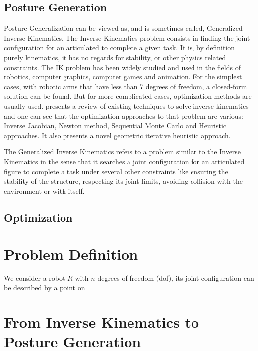\subsection{Posture Generation}
\label{sub:posture_generation}

Posture Generalization can be viewed as, and is sometimes called, Generalized Inverse Kinematics.
The Inverse Kinematics problem consists in finding the joint configuration for an articulated to complete a given task.
It is, by definition purely kinematics, it has no regards for stability, or other physics related constraints.
The IK problem has been widely studied and used in the fields of robotics, computer graphics, computer games and animation.
For the simplest cases, with robotic arms that have less than 7 degrees of freedom, a closed-form solution can be found.
But for more complicated cases, optimization methods are usually used.
\cite{aristidou2009} presents a review of existing techniques to solve inverse kinematics and one can see that the optimization approaches to that problem are various: Inverse Jacobian, Newton method, Sequential Monte Carlo and Heuristic approaches. It also presents a novel geometric iterative heuristic approach.

The Generalized Inverse Kinematics refers to a problem similar to the Inverse Kinematics in the sense that it searches a joint configuration for an articulated figure to complete a task under several other constraints like ensuring the stability of the structure, respecting its joint limits, avoiding collision with the environment or with itself.

\subsection{Optimization}
\label{sub:optimization}

\section{Problem Definition}
\label{sec:problem_definition}

We consider a robot $\mathit{R}$ with $n$ degrees of freedom (dof), its joint configuration can be described by a point on

\section{From Inverse Kinematics to Posture Generation}
\label{sec:from_inverse_kinematics_to_posture_generation}

